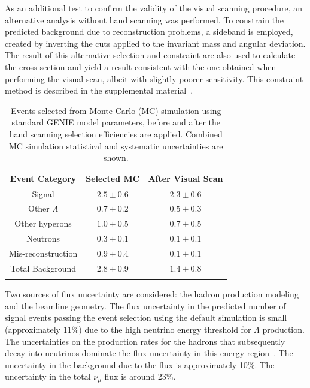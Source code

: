 \documentclass[aps,prl,twocolumn,superscriptaddress]{revtex4}
\begin{document}
As an additional test to confirm the validity of the visual scanning procedure, an alternative analysis without hand scanning was performed. To constrain the predicted background due to reconstruction problems, a sideband is employed, created by inverting the cuts applied to the invariant mass and angular deviation. The result of this alternative selection and constraint are also used to calculate the cross section and yield a result consistent with the one obtained when performing the visual scan, albeit with slightly poorer sensitivity. This constraint method is described in the supplemental material~\cite{SupplementalMaterial}.

\begin{table}
    \centering
    \begin{tabular}{ccc}
    \hhline{===} 
        Event Category & Selected MC & After Visual Scan \\
        \hline
        Signal & $2.5 \pm 0.6$ & $2.3 \pm 0.6$ \\
        \hline
        Other $\Lambda$ & $0.7 \pm 0.2$ & $0.5 \pm 0.3$ \\
        Other hyperons & $1.0 \pm 0.5$ & $0.7 \pm 0.5$ \\
        Neutrons & $0.3 \pm 0.1$ & $0.1 \pm 0.1$ \\
        Mis-reconstruction & $0.9 \pm 0.4$ & $0.1 \pm 0.1$ \\
        \hline 
        Total Background & $2.8 \pm 0.9$ & $1.4 \pm 0.8$ \\
        \hhline{===}
    \end{tabular}
    \caption{Events selected from Monte Carlo (MC) simulation using standard GENIE model parameters, before and after the hand scanning selection efficiencies are applied. Combined MC simulation statistical and systematic uncertainties are shown.}
    \label{tab:SelectedEvents}
\end{table}

Two sources of flux uncertainty are considered: the hadron production modeling and the beamline geometry. The flux uncertainty in the predicted number of signal events passing the event selection using the default simulation is small (approximately 11\%) due to the high neutrino energy threshold for $\Lambda$ production. The uncertainties on the production rates for the hadrons that subsequently decay into neutrinos dominate the flux uncertainty in this energy region~\cite{AliagaSoplin:2016shs}. The uncertainty in the background due to the flux is approximately 10\%. The uncertainty in the total $\bar{\nu}_{\mu}$ flux is around 23\%.
\end{document}
